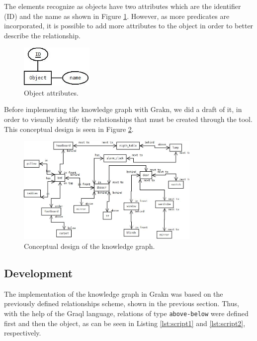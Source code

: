 The elements recognize as objects have two attributes which are the identifier (ID) and the name as shown in Figure \ref{fig:object}. However, as more predicates are incorporated, it is possible to add more attributes to the object in order to better describe the relationship.

\begin{figure}[H]
    \centering
    \includegraphics[width=3.5cm]{figures/object.jpg}
    \caption{Object attributes.}
    \label{fig:object}
\end{figure}

Before implementing the knowledge graph with Grakn, we did a draft of it, in order to visually identify the relationships that must be created through the tool. This conceptual design is seen in Figure \ref{fig:grafo}.

\begin{figure}[H]
    \centering
    \includegraphics[width=8.8cm]{figures/grafo.jpg}
    \caption{Conceptual design of the knowledge graph.}
    \label{fig:grafo}
\end{figure}

\subsection{Development}

The implementation of the knowledge graph in Grakn was based on the previously defined relationships scheme, shown in the previous section. Thus, with the help of the Graql language, relations of type \texttt{above-below} were defined first and then the object, as can be seen in Listing \ref{lst:script1} and \ref{lst:script2}, respectively.



